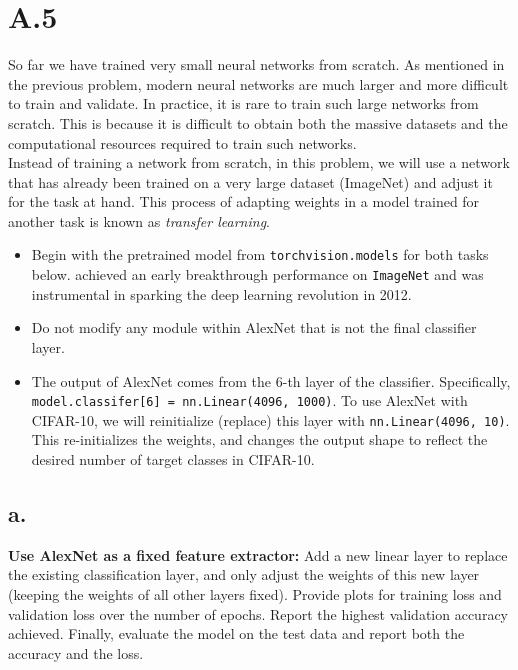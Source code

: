 \documentclass{article}
\newcommand{\1}{\mathbf{1}}
\begin{document}
\section*{A.5}
{\Large 


So far we have trained very small neural networks from scratch. As mentioned in the previous problem, modern neural networks are much larger and more difficult to train and validate. In practice, it is rare to train such large networks from scratch. This is because it is difficult to obtain both the massive datasets and the computational resources required to train such networks. \\
 
 Instead of training a network from scratch, in this problem, we will use a network that has already been trained on a very large dataset (ImageNet) and adjust it for the task at hand. This process of adapting weights in a model trained for another task is known as \textit{transfer learning}.
\begin{itemize}
    \item Begin with the pretrained  model from \texttt{torchvision.models} for both tasks below.  achieved an early breakthrough performance on \texttt{ImageNet} and was instrumental in sparking the deep learning revolution in 2012.
    \item Do not modify any module within AlexNet that is not the final classifier layer.
    \item The output of AlexNet comes from the $6$-th layer of the classifier. Specifically, \texttt{model.classifer[6] = nn.Linear(4096, 1000)}. To use AlexNet with CIFAR-10, we will reinitialize (replace) this layer with \texttt{nn.Linear(4096, 10)}. This re-initializes the weights, and changes the output shape to reflect the desired number of target classes in CIFAR-10. 
\end{itemize}

\subsection*{a.}

\textbf{Use AlexNet as a fixed feature extractor:} Add a new linear layer to replace the existing classification layer, and only adjust the weights of this new layer (keeping the weights of all other layers fixed). Provide plots for training loss and validation loss over the number of epochs. Report the highest validation accuracy achieved. Finally, evaluate the model on the test data and report both the accuracy and the loss.  
    
}
\end{document}
